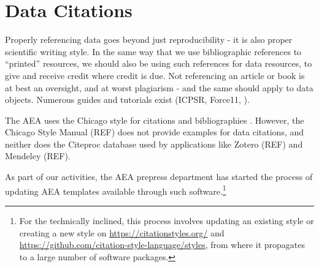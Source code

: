 \documentclass[AEJ]{AEA}
\begin{document}
\section{Data Citations}
Properly referencing data goes beyond just reproducibility - it is also proper scientific writing style. In the same way that we use bibliographic references to ``printed'' resources, we should also be using such references for data resources, to give and receive credit where credit is due. Not referencing an article or book is at best an oversight, and at worst plagiarism - and the same should apply to data objects. Numerous guides and tutorials exist (ICPSR, Force11, \cite{dataone-l09}).

The AEA uses the Chicago style for citations and bibliographies \citep{aeadatarefs}. However, the Chicago Style Manual (REF) does not provide examples for data citations, and neither does the Citeproc database used by applications like Zotero (REF) and Mendeley (REF).

As part of our activities, the AEA prepress department has started the process of updating AEA templates available through such software.\footnote{For the technically inclined, this process involves updating an existing style or creating a new style on \url{https://citationstyles.org/} and \url{https://github.com/citation-style-language/styles}, from where it propagates to a large number of software packages.}  
\end{document}
